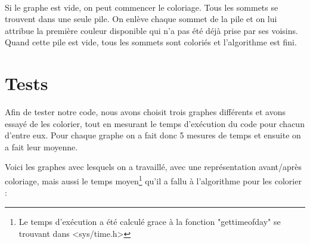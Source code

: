 \documentclass[a4paper, 11pt, oneside]{article}
\begin{document}
	\paragraph{}
	Si le graphe est vide, on peut commencer le coloriage. Tous les sommets se trouvent dans une seule pile. On enlève chaque sommet de la pile et on lui attribue la première couleur disponible qui n'a pas été déjà prise par ses voisins. Quand cette pile est vide, tous les sommets sont coloriés et l'algorithme est fini.

	\newpage
	\section{Tests}
	Afin de tester notre code, nous avons choisit trois graphes différents et avons essayé de les colorier, tout en mesurant le temps d'exécution du code pour chacun d'entre eux. Pour chaque graphe on a fait donc 5 mesures de temps et ensuite on a fait leur moyenne. \par
	Voici les graphes avec lesquels on a travaillé, avec une représentation avant/après coloriage, mais aussi le temps moyen\footnote{Le temps d'exécution a été calculé grace à la fonction "gettimeofday" se trouvant dans <sys/time.h>} qu'il a fallu à l'algorithme pour les colorier : 
\end{document}
